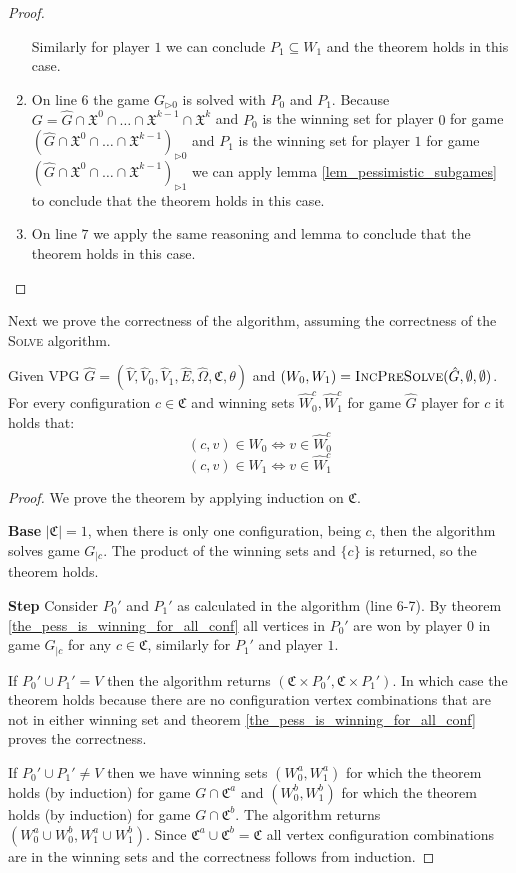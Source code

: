 \begin{theorem}
\begin{proof}
\begin{enumerate}
			Similarly for player $1$ we can conclude $P_1 \subseteq W_1$ and the theorem holds in this case.
			\item On line $6$ the game $G_{\triangleright0}$ is solved with $P_0$ and $P_1$. Because $G = \hat{G} \cap \mathfrak{X}^0 \cap \dots \cap \mathfrak{X}^{k-1} \cap \mathfrak{X}^k$ and $P_0$ is the winning set for player $0$ for game $(\hat{G} \cap \mathfrak{X}^0 \cap \dots \cap \mathfrak{X}^{k-1})_{\triangleright0}$ and $P_1$ is the winning set for player $1$ for game $(\hat{G} \cap \mathfrak{X}^0 \cap \dots \cap \mathfrak{X}^{k-1})_{\triangleright1}$ we can apply lemma \ref{lem_pessimistic_subgames} to conclude that the theorem holds in this case.
			\item On line $7$ we apply the same reasoning and lemma to conclude that the theorem holds in this case.
		\end{enumerate}
	\end{proof}
\end{theorem}

Next we prove the correctness of the algorithm, assuming the correctness of the \textsc{Solve} algorithm.
\begin{theorem}
	Given VPG $\hat{G} = (\hat{V},\hat{V}_0,\hat{V}_1,\hat{E},\hat{\Omega},\mathfrak{C},\theta)$ and $(W_0,W_1) = \textsc{IncPreSolve}(\hat{G},\emptyset,\emptyset)$. For every configuration $c \in \mathfrak{C}$ and winning sets $\hat{W}_0^c, \hat{W}_1^c$ for game $\hat{G}$ player for $c$ it holds that:
	\[ (c,v) \in W_0 \iff v \in \hat{W}_0^c \]
	\[ (c,v) \in W_1 \iff v \in \hat{W}_1^c \]
	\begin{proof}
		We prove the theorem by applying induction on $\mathfrak{C}$.
		
		\textbf{Base} $|\mathfrak{C}| = 1$, when there is only one configuration, being $c$, then the algorithm solves game $G_{|c}$. The product of the winning sets and $\{c\}$ is returned, so the theorem holds.
		
		\textbf{Step} Consider $P_0'$ and $P_1'$ as calculated in the algorithm (line 6-7). By theorem \ref{the_pess_is_winning_for_all_conf} all vertices in $P_0'$ are won by player $0$ in game $G_{|c}$ for any $c \in \mathfrak{C}$, similarly for $P_1'$ and player $1$.
		
		If $P_0' \cup P_1' = V$ then the algorithm returns $(\mathfrak{C} \times P_0',\mathfrak{C} \times P_1')$. In which case the theorem holds because there are no configuration vertex combinations that are not in either winning set and theorem \ref{the_pess_is_winning_for_all_conf} proves the correctness.
		
		If $P_0' \cup P_1' \neq V$ then we have winning sets $(W_0^a, W_1^a)$ for which the theorem holds (by induction) for game $G \cap \mathfrak{C}^a$ and $(W_0^b, W_1^b)$ for which the theorem holds (by induction) for game $G \cap \mathfrak{C}^b$. The algorithm returns $(W_0^a \cup W_0^b, W_1^a \cup W_1^b)$. Since $\mathfrak{C}^a \cup \mathfrak{C}^b = \mathfrak{C}$ all vertex configuration combinations are in the winning sets and the correctness follows from induction.
	\end{proof}
\end{theorem}

